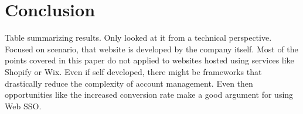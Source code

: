 \section{Conclusion}

Table summarizing results.
Only looked at it from a technical perspective.
Focused on scenario, that website is developed by the company itself.
Most of the points covered in this paper do not applied to websites hosted using services
like Shopify or Wix.
Even if self developed, there might be frameworks that drastically reduce the complexity of
account management.
Even then opportunities like the increased conversion rate make a good argument for using Web \ac{SSO}.